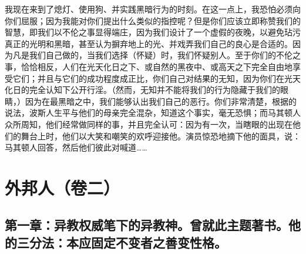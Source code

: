 我现在来到了熄灯、使用狗、并实践黑暗行为的时刻。在这一点上，我恐怕必须向你们屈服；因为我能对你们提出什么类似的指控呢？但是你们应该立即称赞我们的智慧，即我们以不伦之事显得端庄，因为我们设计了一个虚假的夜晚，以避免玷污真正的光明和黑暗，甚至认为摒弃地上的光、并戏弄我们自己的良心是合适的。因为凡是我们自己做的，当我们选择（怀疑）时，我们怀疑别人。至于你们的不伦之事，恰恰相反，人们在光天化日之下、或自然的黑夜中、或高天之下完全自由地享受它们；并且与它们的成功程度成正比，你们自己对结果的无知，因为你们在光天化日的完全认知下公开行淫。（然而，无知并不能将我们的行为隐藏于我们的眼睛，）因为在最黑暗之中，我们能够认出我们自己的恶行。你们非常清楚，根据的说法，波斯人生平与他们的母亲完全混杂，知道这个事实，毫无恐惧；而马其顿人众所周知，他们经常做同样的事，并且完全认可：因为有一次，当瞎眼的出现在他们的舞台上时，他们以大笑和嘲笑的欢呼迎接他。演员惊恐地摘下他的面具，说：马其顿人回答，然后他们彼此对喊道……\par



\section{外邦人（卷二）}


\subsection{第一章：异教权威笔下的异教神。曾就此主题著书。他的三分法：本应固定不变者之善变性格。}

